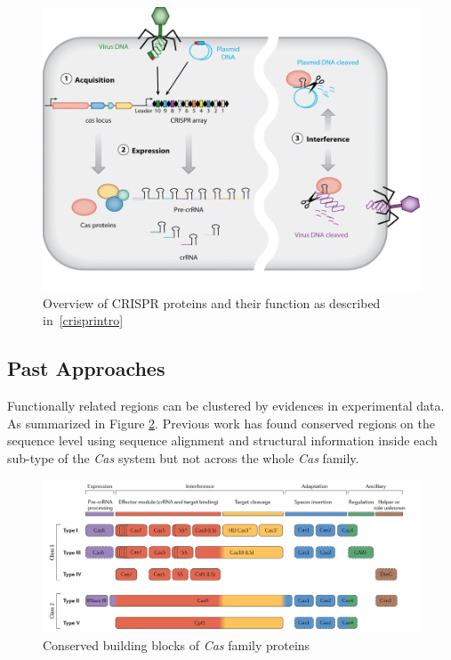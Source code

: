 \documentclass[11pt, oneside]{article}
\begin{document}
\begin{figure}[ht]
  \centering
  \includegraphics[scale = 0.4]{images/crisprOverview}
      \caption{Overview of CRISPR proteins and their function as described in~\ref{crisprintro} ~\cite{annualreview}}
      \label{crisprOverview}
\end{figure}

\subsection{Past Approaches}
Functionally related regions can be clustered by evidences in experimental data. As summarized in Figure \ref{buildingBlocks}. Previous work has found conserved regions on the sequence level  using sequence alignment and structural information\cite{preWork} inside each sub-type of the \textit{Cas} system but not across the whole \textit{Cas} family.

\begin{figure}[ht]
  \centering
  \includegraphics[scale = 0.35]{images/buildingBlocks}
      \caption{Conserved building blocks of \textit{Cas} family proteins}
      \label{buildingBlocks}
\end{figure}
\end{document}
